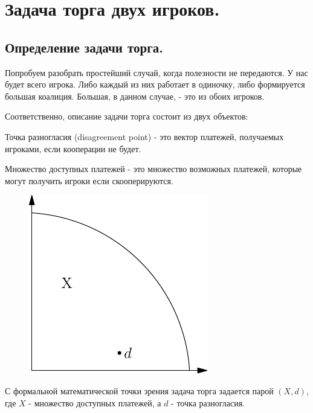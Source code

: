 
\section{Задача торга двух игроков.}




\subsection{Определение задачи торга.}

Попробуем разобрать простейший случай, когда полезности не передаются.
У нас будет всего  игрока. Либо каждый из них работает
в одиночку, либо формируется большая коалиция. Большая, в данном случае,
- это из обоих игроков.

Соответственно, описание задачи торга состоит из двух объектов:

\begin{mydef} Точка разногласия  (disagreement point) - это вектор
платежей, получаемых игроками, если кооперации не будет. \end{mydef}

\begin{mydef} Множество доступных платежей  - это множество возможных платежей,
которые могут получить игроки если скооперируются. \end{mydef}

\begin{figure}[htbp]
	\includegraphics{coop_feasible.pdf}
\end{figure}


С формальной математической точки зрения задача торга задается парой
$(X,d)$, где $X$ - множество доступных платежей, а $d$ - точка разногласия.

